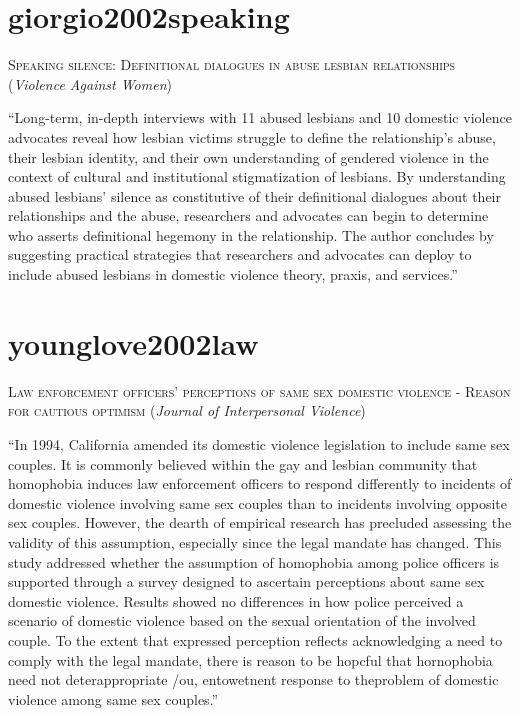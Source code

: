 \documentclass[]{tufte-handout}
\begin{document}
\section{\texorpdfstring{\textcolor[HTML]{5b0057}{giorgio2002speaking}}{}}\label{section-26}

\textsc{\large{Speaking silence: Definitional dialogues in abuse lesbian relationships}}
(\emph{Violence Against Women})

``Long-term, in-depth interviews with 11 abused lesbians and 10 domestic
violence advocates reveal how lesbian victims struggle to define the
relationship's abuse, their lesbian identity, and their own
understanding of gendered violence in the context of cultural and
institutional stigmatization of lesbians. By understanding abused
lesbians' silence as constitutive of their definitional dialogues about
their relationships and the abuse, researchers and advocates can begin
to determine who asserts definitional hegemony in the relationship. The
author concludes by suggesting practical strategies that researchers and
advocates can deploy to include abused lesbians in domestic violence
theory, praxis, and services.''

\section{\texorpdfstring{\textcolor[HTML]{5b0057}{younglove2002law}}{}}\label{section-27}

\textsc{\large{Law enforcement officers' perceptions of same sex domestic violence - Reason for cautious optimism}}
(\emph{Journal of Interpersonal Violence})

``In 1994, California amended its domestic violence legislation to
include same sex couples. It is commonly believed within the gay and
lesbian community that homophobia induces law enforcement officers to
respond differently to incidents of domestic violence involving same sex
couples than to incidents involving opposite sex couples. However, the
dearth of empirical research has precluded assessing the validity of
this assumption, especially since the legal mandate has changed. This
study addressed whether the assumption of homophobia among police
officers is supported through a survey designed to ascertain perceptions
about same sex domestic violence. Results showed no differences in how
police perceived a scenario of domestic violence based on the sexual
orientation of the involved couple. To the extent that expressed
perception reflects acknowledging a need to comply with the legal
mandate, there is reason to be hopcful that hornophobia need not
deterappropriate /ou, entowetnent response to theproblem of domestic
violence among same sex couples.''
\end{document}
